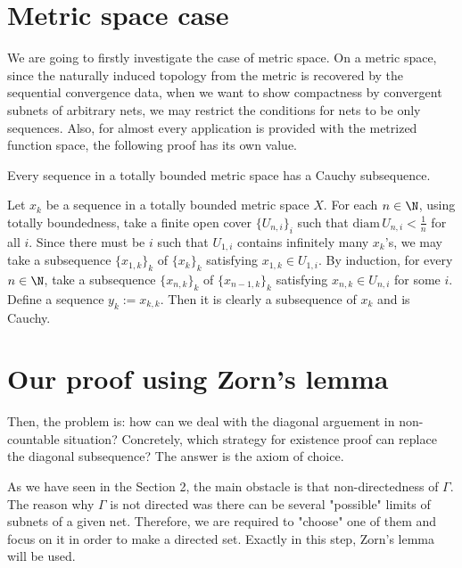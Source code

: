 \documentclass[11pt]{amsart}
\begin{document}
\section{Metric space case}

We are going to firstly investigate the case of metric space.
On a metric space, since the naturally induced topology from the metric is recovered by the sequential convergence data, when we want to show compactness by convergent subnets of arbitrary nets, we may restrict the conditions for nets to be only sequences.
Also, for almost every application is provided with the metrized function space, the following proof has its own value.


\begin{thm}
Every sequence in a totally bounded metric space has a Cauchy subsequence.
\end{thm}

\begin{pf}
Let $x_k$ be a sequence in a totally bounded metric space $X$.
For each $n\in\N$, using totally boundedness, take a finite open cover $\{U_{n,i}\}_i$ such that $\mathrm{diam}\,U_{n,i}<\frac1n$ for all $i$.
Since there must be $i$ such that $U_{1,i}$ contains infinitely many $x_k$'s, we may take a subsequence $\{x_{1,k}\}_k$ of $\{x_k\}_k$ satisfying $x_{1,k}\in U_{1,i}$.
By induction, for every $n\in\N$, take a subsequence $\{x_{n,k}\}_k$ of $\{x_{n-1,k}\}_k$ satisfying $x_{n,k}\in U_{n,i}$ for some $i$.
Define a sequence $y_k:=x_{k,k}$.
Then it is clearly a subsequence of $x_k$ and is Cauchy.
\end{pf}





\section{Our proof using Zorn's lemma}

Then, the problem is: how can we deal with the diagonal arguement in non-countable situation?
Concretely, which strategy for existence proof can replace the diagonal subsequence?
The answer is the axiom of choice.

As we have seen in the Section 2, the main obstacle is that non-directedness of $\Gamma$.
The reason why $\Gamma$ is not directed was there can be several "possible" limits of subnets of a given net.
Therefore, we are required to "choose" one of them and focus on it in order to make a directed set.
Exactly in this step, Zorn's lemma will be used.
 
\end{document}

